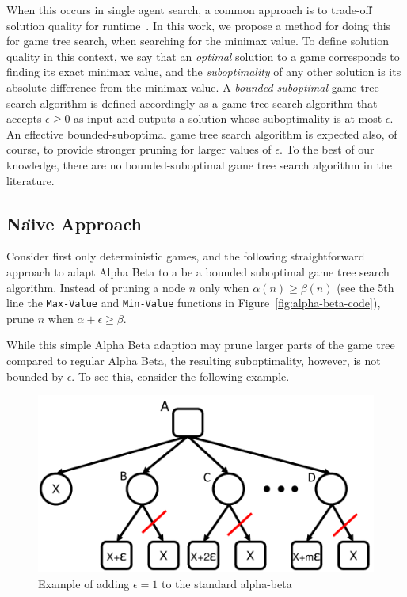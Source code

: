 \documentclass[letterpaper]{article} %
\begin{document}
When this occurs in single agent search, a common approach is to trade-off solution quality for runtime~\cite{pohl1970heuristic,thayer2011bounded,gilon2016dynamic}. 
In this work, we propose a method for doing this for game tree search, when searching for the minimax value. 
To define solution quality in this context, we say that an  \emph{optimal} solution to a game corresponds to finding its exact minimax value, and the \emph{suboptimality} of any other solution is its absolute difference from the minimax value. %
A \emph{bounded-suboptimal} game tree search algorithm is defined accordingly as a game tree search algorithm that accepts $\epsilon\geq 0$ as input and outputs a solution whose suboptimality is at most $\epsilon$. 
An effective bounded-suboptimal game tree search algorithm is expected also, of course, to provide stronger pruning for larger values of $\epsilon$. To the best of our knowledge, there are no bounded-suboptimal game tree search algorithm in the literature. 

\subsection{Na\"{\i}ve Approach}
Consider first only deterministic games, and the following straightforward approach to adapt Alpha Beta to a be a bounded suboptimal  game tree search algorithm. Instead of pruning a node $n$ only when $\alpha(n)\geq \beta(n)$ (see the 5th line the {\tt Max-Value} and {\tt Min-Value} functions in Figure~\ref{fig:alpha-beta-code}), prune $n$  when $\alpha+\epsilon\geq \beta$. 

While this simple Alpha Beta adaption may prune larger parts of the game tree compared to regular Alpha Beta, the resulting suboptimality, however, is not bounded by $\epsilon$. To see this, consider the following example. 

\begin{figure}
	\centering
	\includegraphics[width=0.85\columnwidth]{Figures/example_e.pdf}
	\caption{Example of adding $\epsilon=1$ to the standard alpha-beta}
	\label{fig:example-e}
\end{figure}
\end{document}
